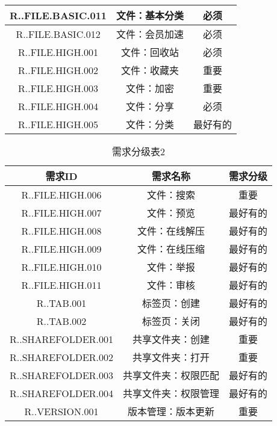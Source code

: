 \begin{table}[htbp]
\begin{tabular}{|c|c|c|}
    R..FILE.BASIC.011 & 文件：基本分类 & 必须 \\
    \hline
    R..FILE.BASIC.012 & 文件：会员加速 & 必须 \\
    \hline
    R..FILE.HIGH.001 & 文件：回收站 & 必须 \\
    \hline
    R..FILE.HIGH.002 & 文件：收藏夹 & 重要 \\
    \hline
    R..FILE.HIGH.003 & 文件：加密 & 重要 \\
    \hline
    R..FILE.HIGH.004 & 文件：分享 & 必须 \\
    \hline
    R..FILE.HIGH.005 & 文件：分类 & 最好有的 \\
    \hline 
\end{tabular}
\end{table}
\begin{table}[htbp]
\centering
\caption{需求分级表2} \label{tab:abbr}
\begin{tabular}{|c|c|c|}
    \hline
    需求ID & 需求名称 & 需求分级 \\
    \hline
    R..FILE.HIGH.006 & 文件：搜索 & 重要 \\
    \hline
    R..FILE.HIGH.007 & 文件：预览 & 最好有的 \\
    \hline
    R..FILE.HIGH.008 & 文件：在线解压 & 最好有的 \\
    \hline
    R..FILE.HIGH.009 & 文件：在线压缩 & 最好有的 \\
    \hline
    R..FILE.HIGH.010 & 文件：举报 & 最好有的 \\
    \hline
    R..FILE.HIGH.011 & 文件：审核 & 最好有的 \\
    \hline
    R..TAB.001 & 标签页：创建 & 最好有的 \\
    \hline
    R..TAB.002 & 标签页：关闭 & 最好有的 \\
    \hline
    R..SHAREFOLDER.001 & 共享文件夹：创建 & 重要 \\
    \hline
    R..SHAREFOLDER.002 & 共享文件夹：打开 & 重要 \\
    \hline
    R..SHAREFOLDER.003 & 共享文件夹：权限匹配 & 最好有的 \\
    \hline
    R..SHAREFOLDER.004 & 共享文件夹：权限管理 & 最好有的 \\
    \hline
    R..VERSION.001 & 版本管理：版本更新 & 重要 \\
    \hline
\end{tabular}
\end{table}
